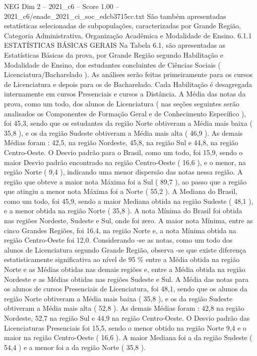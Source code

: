 \begin{textsample}{NEG Dim 2 – 2021\_c6 – Score 1.00 – 2021\_c6/enade\_2021\_ci\_soc\_edcb3715cc.txt}
São também apresentadas estatísticas selecionadas de subpopulações, caracterizadas por Grande Região, Categoria Administrativa, Organização Acadêmica e Modalidade de Ensino. 6.1.1 ESTATÍSTICAS BÁSICAS GERAIS Na Tabela 6.1, são apresentadas as Estatísticas Básicas da prova, por Grande Região segundo Habilitação e Modalidade de Ensino, dos estudantes concluintes de Ciências Sociais ( Licenciatura/Bacharelado ).
As análises serão feitas primeiramente para os cursos de Licenciatura e depois para os de Bacharelado.
Cada Habilitação é desagregada internamente em cursos Presenciais e cursos a Distância.
A Média das notas da prova, como um todo, dos alunos de Licenciatura ( nas seções seguintes serão analisados os Componentes de Formação Geral e de Conhecimento Específico ), foi 45,3, sendo que os estudantes da região Norte obtiveram a Média mais baixa ( 35,8 ), e os da região Sudeste obtiveram a Média mais alta ( 46,9 ).
As demais Médias foram : 42,5, na região Nordeste, 45,8, na região Sul e 44,8, na região Centro-Oeste.
O Desvio padrão para o Brasil, como um todo, foi 15,9, sendo o maior Desvio padrão encontrado na região Centro-Oeste ( 16,6 ), e o menor, na região Norte ( 9,4 ), indicando uma menor dispersão das notas nessa região.
A região que obteve a maior nota Máxima foi a Sul ( 89,7 ), ao passo que a região que atingiu a menor nota Máxima foi a Norte ( 55,2 ).
A Mediana do Brasil, como um todo, foi 45,9, sendo a maior Mediana obtida na região Sudeste ( 48,1 ), e a menor obtida na região Norte ( 35,8 ).
A nota Mínima do Brasil foi obtida nas regiões Nordeste, Sudeste e Sul, onde foi zero.
A maior nota Mínima, entre as cinco Grandes Regiões, foi 16,4, na região Norte e, a nota Mínima obtida na região Centro-Oeste foi 12,0.
Considerando -se as notas, como um todo dos alunos de Licenciatura segundo Grande Região, observa -se que existe diferença estatisticamente significativa ao nível de 95 \% entre a Média obtida na região Norte e as Médias obtidas nas demais regiões e, entre a Média obtida na região Nordeste e as Médias obtidas nas regiões Sudeste e Sul.
A Média das notas para os alunos de cursos Presenciais de Licenciatura, foi 48,1, sendo que os alunos da região Norte obtiveram a Média mais baixa ( 35,8 ), e os da região Sudeste obtiveram a Média mais alta ( 52,8 ).
As demais Médias foram : 42,8 na região Nordeste, 52,7 na região Sul e 44,9 na região Centro-Oeste.
O Desvio padrão das Licenciaturas Presenciais foi 15,5, sendo o menor obtido na região Norte 9,4 e o maior na região Centro-Oeste ( 16,6 ).
A maior Mediana foi a da região Sudeste ( 54,4 ) e a menor foi a da região Norte ( 35,8 ).

\end{textsample}
